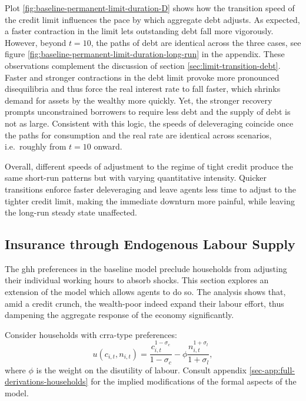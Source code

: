 \documentclass[a4paper,12pt]{article} %
\numberwithin{equation}{section} %
\numberwithin{figure}{section}
\numberwithin{table}{section}
\begin{document}
Plot \ref{fig:baseline-permanent-limit-duration-D} shows how the transition speed of the credit limit influences the pace by which aggregate debt adjusts. As expected, a faster contraction in the limit lets outstanding debt fall more vigorously. However, beyond $t=10$, the paths of debt are identical across the three cases, see figure \ref{fig:baseline-permanent-limit-duration-long-run} in the appendix. These observations complement the discussion of section \ref{sec:limit-transition-debt}. Faster and stronger contractions in the debt limit provoke more pronounced disequilibria and thus force the real interest rate to fall faster, which shrinks demand for assets by the wealthy more quickly. Yet, the stronger recovery prompts unconstrained borrowers to require less debt and the supply of debt is not as large. Consistent with this logic, the speeds of deleveraging coincide once the paths for consumption and the real rate are identical across scenarios, i.e.~roughly from $t=10$ onward.

Overall, different speeds of adjustment to the regime of tight credit produce the same short-run patterns but with varying quantitative intensity. Quicker transitions enforce faster deleveraging and leave agents less time to adjust to the tighter credit limit, making the immediate downturn more painful, while leaving the long-run steady state unaffected.

\subsection{Insurance through Endogenous Labour Supply}
\label{sec:sensitivity-end-labour}

The \Gls{ghh} preferences in the baseline model preclude households from adjusting their individual working hours to absorb shocks. This section explores an extension of the model which allows agents to do so. The analysis shows that, amid a credit crunch, the wealth-poor indeed expand their labour effort, thus dampening the aggregate response of the economy significantly.

Consider households with \Gls{crra}-type preferences:
\begin{equation}
    u(c_{i,t}, n_{i,t}) = \frac{c_{i,t}^{1-\sigma_c}}{1-\sigma_c} - \phi \frac{n_{i,t}^{1+\sigma_l}}{1+\sigma_l}, \label{eq:hh-crra-utility}
\end{equation}
where $\phi$ is the weight on the disutility of labour. Consult appendix \ref{sec-app:full-derivations-households} for the implied modifications of the formal aspects of the model. 
\end{document}
